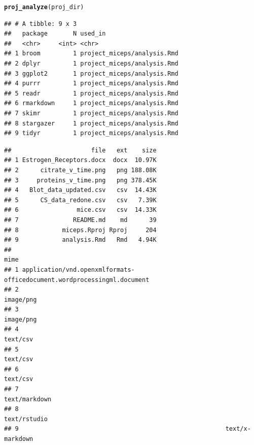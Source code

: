 \documentclass[APA,LATO1COL]{WileyNJD-v2}\usepackage[]{graphicx}\usepackage[]{color}
\makeatletter
\newcommand{\hlstd}[1]{\textcolor[rgb]{0.345,0.345,0.345}{#1}}%
\newcommand{\hlkwd}[1]{\textcolor[rgb]{0.737,0.353,0.396}{\textbf{#1}}}%
\newenvironment{kframe}{%
 \def\at@end@of@kframe{}%
 \ifinner\ifhmode%
  \def\at@end@of@kframe{\end{minipage}}%
  \begin{minipage}{\columnwidth}%
 \fi\fi%
 \def\FrameCommand##1{\hskip\@totalleftmargin \hskip-\fboxsep
 \colorbox{shadecolor}{##1}\hskip-\fboxsep
     \hskip-\linewidth \hskip-\@totalleftmargin \hskip\columnwidth}%
 \MakeFramed {\advance\hsize-\width
   \@totalleftmargin\z@ \linewidth\hsize
   \@setminipage}}%
 {\par\unskip\endMakeFramed%
 \at@end@of@kframe}
\newenvironment{knitrout}{}{} %
\makeatother
\begin{document}
\begin{knitrout}
\color{fgcolor}\begin{kframe}
\begin{alltt}
\hlkwd{proj_analyze}\hlstd{(proj_dir)}
\end{alltt}


{\ttfamily\noindent\itshape\color{messagecolor}{\#\# -- Analysis of reproducibility for project\_miceps --------------------------- fertile 0.0.0.9027 --}}

{\ttfamily\noindent\itshape\color{messagecolor}{\#\# --\ \  Packages referenced in source code ------------------------------------- fertile 0.0.0.9027 --}}\begin{verbatim}
## # A tibble: 9 x 3
##   package       N used_in                    
##   <chr>     <int> <chr>                      
## 1 broom         1 project_miceps/analysis.Rmd
## 2 dplyr         1 project_miceps/analysis.Rmd
## 3 ggplot2       1 project_miceps/analysis.Rmd
## 4 purrr         1 project_miceps/analysis.Rmd
## 5 readr         1 project_miceps/analysis.Rmd
## 6 rmarkdown     1 project_miceps/analysis.Rmd
## 7 skimr         1 project_miceps/analysis.Rmd
## 8 stargazer     1 project_miceps/analysis.Rmd
## 9 tidyr         1 project_miceps/analysis.Rmd
\end{verbatim}


{\ttfamily\noindent\itshape\color{messagecolor}{\#\# --\ \  Files present in directory --------------------------------------------- fertile 0.0.0.9027 --}}\begin{verbatim}
##                      file   ext    size
## 1 Estrogen_Receptors.docx  docx  10.97K
## 2      citrate_v_time.png   png 188.08K
## 3     proteins_v_time.png   png 378.45K
## 4   Blot_data_updated.csv   csv  14.43K
## 5      CS_data_redone.csv   csv   7.39K
## 6                mice.csv   csv  14.33K
## 7               README.md    md      39
## 8            miceps.Rproj Rproj     204
## 9            analysis.Rmd   Rmd   4.94K
##                                                                      mime
## 1 application/vnd.openxmlformats-officedocument.wordprocessingml.document
## 2                                                               image/png
## 3                                                               image/png
## 4                                                                text/csv
## 5                                                                text/csv
## 6                                                                text/csv
## 7                                                           text/markdown
## 8                                                            text/rstudio
## 9                                                         text/x-markdown
\end{verbatim}



\end{kframe}
\end{knitrout}
\end{document}

